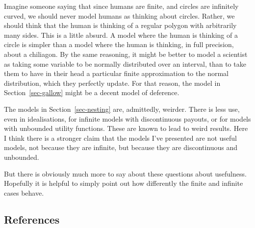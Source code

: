 \documentclass[
  12pt,
  letterpaper,
  DIV=11,
  numbers=noendperiod]{scrartcl}
\begin{document}
Imagine someone saying that since humans are finite, and circles are
infinitely curved, we should never model humans as thinking about
circles. Rather, we should think that the human is thinking of a regular
polygon with arbitrarily many sides. This is a little absurd. A model
where the human is thinking of a circle is simpler than a model where
the human is thinking, in full precision, about a chiliagon. By the same
reasoning, it might be better to model a scientist as taking some
variable to be normally distributed over an interval, than to take them
to have in their head a particular finite approximation to the normal
distribution, which they perfectly update. For that reason, the model in
Section~\ref{sec-gallow} might be a decent model of deference.

The models in Section~\ref{sec-nesting} are, admittedly, weirder. There
is less use, even in idealisations, for infinite models with
discontinuous payouts, or for models with unbounded utility functions.
These are known to lead to weird results. Here I think there is a
stronger claim that the models I've presented are not useful models, not
because they are infinite, but because they are discontinuous and
unbounded.

But there is obviously much more to say about these questions about
usefulness. Hopefully it is helpful to simply point out how differently
the finite and infinite cases behave.

\subsection*{References}\label{references}
\end{document}
